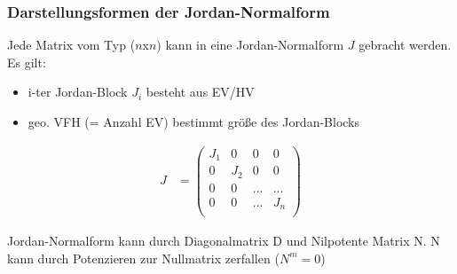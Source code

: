 \documentclass[10pt,a4paper]{article}
\begin{document}
\subsubsection{Darstellungsformen der Jordan-Normalform}
Jede Matrix vom Typ ($n$x$n$) kann in eine Jordan-Normalform $J$ gebracht werden.
\\Es gilt: 
\begin{itemize}
    \item i-ter Jordan-Block $J_i$ besteht aus EV/HV 
    \item geo. VFH (= Anzahl EV) bestimmt größe des Jordan-Blocks 
\end{itemize}
  \begin{mdframed}[style=exercise]
    \begin{align}
        J &=
        \begin{pmatrix}
             J_1 & 0  & 0 & 0 \\
             0 & J_2  & 0 & 0 \\
             0 & 0  & ... & ... \\
             0 & 0    & ... & J_n \\
        \end{pmatrix} 
    \end{align}
  \end{mdframed}
Jordan-Normalform kann durch Diagonalmatrix D und Nilpotente Matrix N.
N kann durch Potenzieren zur Nullmatrix zerfallen ($N^m = 0$)
\end{document}
